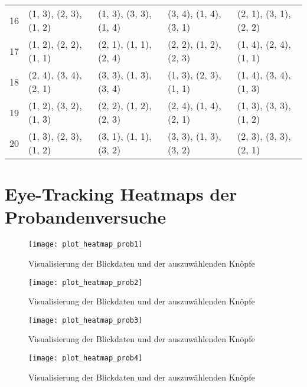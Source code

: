 \begin{table}[H]
{\begin{tabular}{@{}lllll@{}}
			16 & (1, 3), (2, 3), (1, 2) & (1, 3), (3, 3), (1, 4) & (3, 4), (1, 4), (3, 1) & (2, 1), (3, 1), (2, 2) \\
			17 & (1, 2), (2, 2), (1, 1) & (2, 1), (1, 1), (2, 4) & (2, 2), (1, 2), (2, 3) & (1, 4), (2, 4), (1, 1) \\
			18 & (2, 4), (3, 4), (2, 1) & (3, 3), (1, 3), (3, 4) & (1, 3), (2, 3), (1, 1) & (1, 4), (3, 4), (1, 3) \\
			19 & (1, 2), (3, 2), (1, 3) & (2, 2), (1, 2), (2, 3) & (2, 4), (1, 4), (2, 1) & (1, 3), (3, 3), (1, 2) \\
			20 & (1, 3), (2, 3), (1, 2) & (3, 1), (1, 1), (3, 2) & (3, 3), (1, 3), (3, 2) & (2, 3), (3, 3), (2, 1) \\ \bottomrule
		\end{tabular}%
	}
\end{table}

\section{Eye-Tracking Heatmaps der Probandenversuche}
\label{appendix:heatmaps}
\begin{figure}[!htbp]
	\centering
	\texttt{[image: plot\_heatmap\_prob1]}
	\caption[Visualisierung der Blickdaten und der auszuwählenden Knöpfe] {Visualisierung der Blickdaten und der auszuwählenden Knöpfe}
\end{figure}
\begin{figure}[!htbp]
	\centering
	\texttt{[image: plot\_heatmap\_prob2]}
	\caption[Visualisierung der Blickdaten und der auszuwählenden Knöpfe] {Visualisierung der Blickdaten und der auszuwählenden Knöpfe}
\end{figure}
\begin{figure}[!htbp]
	\centering
	\texttt{[image: plot\_heatmap\_prob3]}
	\caption[Visualisierung der Blickdaten und der auszuwählenden Knöpfe] {Visualisierung der Blickdaten und der auszuwählenden Knöpfe}
\end{figure}
\begin{figure}[!htbp]
	\centering
	\texttt{[image: plot\_heatmap\_prob4]}
	\caption[Visualisierung der Blickdaten und der auszuwählenden Knöpfe] {Visualisierung der Blickdaten und der auszuwählenden Knöpfe}
\end{figure}